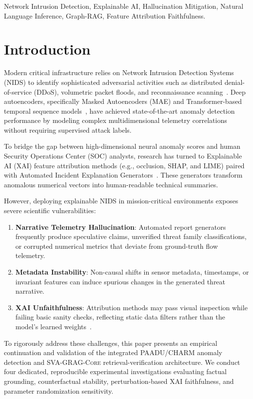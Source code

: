 \documentclass[conference]{IEEEtran}
\begin{document}
\begin{IEEEkeywords}
Network Intrusion Detection, Explainable AI, Hallucination Mitigation, Natural Language Inference, Graph-RAG, Feature Attribution Faithfulness.
\end{IEEEkeywords}

\section{Introduction}
Modern critical infrastructure relies on Network Intrusion Detection Systems (NIDS) to identify sophisticated adversarial activities such as distributed denial-of-service (DDoS), volumetric packet floods, and reconnaissance scanning~\cite{ciciot2023}. Deep autoencoders, specifically Masked Autoencoders (MAE) and Transformer-based temporal sequence models~\cite{vaswani2017attention,he2022masked}, have achieved state-of-the-art anomaly detection performance by modeling complex multidimensional telemetry correlations without requiring supervised attack labels.

To bridge the gap between high-dimensional neural anomaly scores and human Security Operations Center (SOC) analysts, research has turned to Explainable AI (XAI) feature attribution methods (e.g., occlusion, SHAP, and LIME) paired with Automated Incident Explanation Generators~\cite{ribeiro2016why,lundberg2017unified,samek2016evaluating}. These generators transform anomalous numerical vectors into human-readable technical summaries.

However, deploying explainable NIDS in mission-critical environments exposes severe scientific vulnerabilities:
\begin{enumerate}
    \item \textbf{Narrative Telemetry Hallucination}: Automated report generators frequently produce speculative claims, unverified threat family classifications, or corrupted numerical metrics that deviate from ground-truth flow telemetry.
    \item \textbf{Metadata Instability}: Non-causal shifts in sensor metadata, timestamps, or invariant features can induce spurious changes in the generated threat narrative.
    \item \textbf{XAI Unfaithfulness}: Attribution methods may pass visual inspection while failing basic sanity checks, reflecting static data filters rather than the model's learned weights~\cite{adebayo2018sanity}.
\end{enumerate}

To rigorously address these challenges, this paper presents an empirical continuation and validation of the integrated \textsc{PAADU/CHARM} anomaly detection and \textsc{SVA-GRAG-Core} retrieval-verification architecture. We conduct four dedicated, reproducible experimental investigations evaluating factual grounding, counterfactual stability, perturbation-based XAI faithfulness, and parameter randomization sensitivity.
\end{document}
